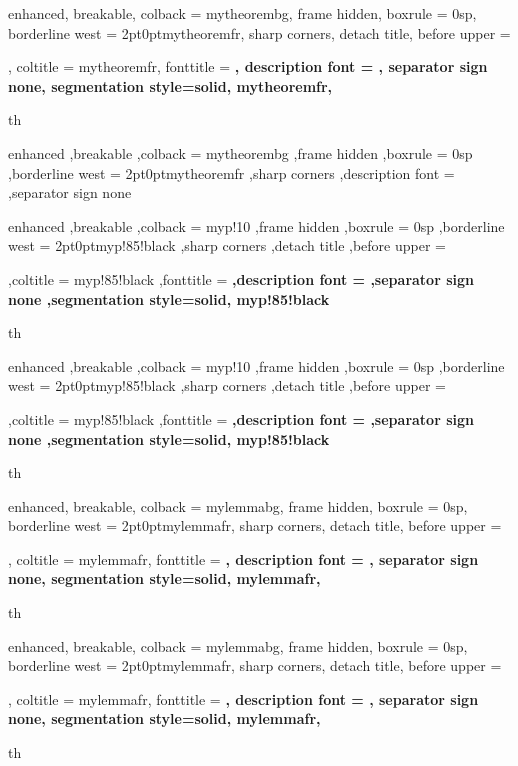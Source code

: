 {%
	enhanced,
	breakable,
	colback = mytheorembg,
	frame hidden,
	boxrule = 0sp,
	borderline west = {2pt}{0pt}{mytheoremfr},
	sharp corners,
	detach title,
	before upper = \tcbtitle\par\smallskip,
	coltitle = mytheoremfr,
	fonttitle = \bfseries\sffamily,
	description font = \mdseries,
	separator sign none,
	segmentation style={solid, mytheoremfr},
}
{th}


{%
	enhanced
	,breakable
	,colback = mytheorembg
	,frame hidden
	,boxrule = 0sp
	,borderline west = {2pt}{0pt}{mytheoremfr}
	,sharp corners
	,description font = \mdseries
	,separator sign none
}

{%
	enhanced
	,breakable
	,colback = myp!10
	,frame hidden
	,boxrule = 0sp
	,borderline west = {2pt}{0pt}{myp!85!black}
	,sharp corners
	,detach title
	,before upper = \tcbtitle\par\smallskip
	,coltitle = myp!85!black
	,fonttitle = \bfseries\sffamily
	,description font = \mdseries
	,separator sign none
	,segmentation style={solid, myp!85!black}
}
{th}
{%
	enhanced
	,breakable
	,colback = myp!10
	,frame hidden
	,boxrule = 0sp
	,borderline west = {2pt}{0pt}{myp!85!black}
	,sharp corners
	,detach title
	,before upper = \tcbtitle\par\smallskip
	,coltitle = myp!85!black
	,fonttitle = \bfseries\sffamily
	,description font = \mdseries
	,separator sign none
	,segmentation style={solid, myp!85!black}
}
{th}



{%
	enhanced,
	breakable,
	colback = mylemmabg,
	frame hidden,
	boxrule = 0sp,
	borderline west = {2pt}{0pt}{mylemmafr},
	sharp corners,
	detach title,
	before upper = \tcbtitle\par\smallskip,
	coltitle = mylemmafr,
	fonttitle = \bfseries\sffamily,
	description font = \mdseries,
	separator sign none,
	segmentation style={solid, mylemmafr},
}
{th}

{%
	enhanced,
	breakable,
	colback = mylemmabg,
	frame hidden,
	boxrule = 0sp,
	borderline west = {2pt}{0pt}{mylemmafr},
	sharp corners,
	detach title,
	before upper = \tcbtitle\par\smallskip,
	coltitle = mylemmafr,
	fonttitle = \bfseries\sffamily,
	description font = \mdseries,
	separator sign none,
	segmentation style={solid, mylemmafr},
}
{th}

